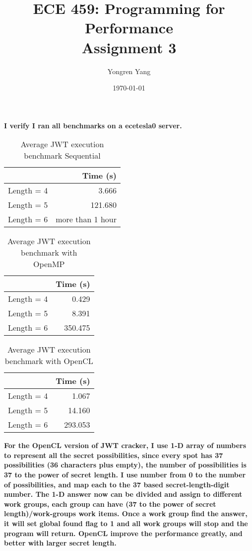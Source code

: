 \documentclass[12pt]{article}
\title{ECE 459: Programming for Performance\\Assignment 3}
\author{Yongren Yang}
\date{\today}
\begin{document}
\maketitle

{\bf I verify I ran all benchmarks on a ecetesla0 server.

\begin{table}[H]
  \centering
  \begin{tabular}{lr}
    & {\bf Time (s)} \\
    \hline
    Length = 4 & 3.666 \\
    Length = 5 & 121.680 \\
    Length = 6 & more than 1 hour \\
  \end{tabular}
  \caption{Average JWT execution benchmark Sequential}
  \label{tbl-zeta-openmp}
\end{table}

\begin{table}[H]
  \centering
  \begin{tabular}{lr}
    & {\bf Time (s)} \\
    \hline
    Length = 4 & 0.429 \\
    Length = 5 & 8.391 \\
    Length = 6 & 350.475 \\
  \end{tabular}
  \caption{Average JWT execution benchmark with OpenMP}
  \label{tbl-zeta-openmp}
\end{table}

\begin{table}[H]
  \centering
  \begin{tabular}{lr}
    & {\bf Time (s)} \\
    \hline
    Length = 4 & 1.067 \\
    Length = 5 & 14.160 \\
    Length = 6 & 293.053 \\
  \end{tabular}
  \caption{Average JWT execution benchmark with OpenCL}
  \label{tbl-zeta-openmp}
\end{table}

{\bf For the OpenCL version of JWT cracker, I use 1-D array of numbers to represent all the secret possibilities, since every spot has 37 possibilities (36 characters plus empty), the number of possibilities is 37 to the power of secret length. I use number from 0 to the number of possibilities, and map each to the 37 based secret-length-digit number. The 1-D answer now can be divided and assign to different work groups, each group can have (37 to the power of secret length)/work-groups work items. Once a work group find the answer, it will set global found flag to 1 and all work groups will stop and the program will return. OpenCL improve the performance greatly, and better with larger secret length.



}}
\end{document}

